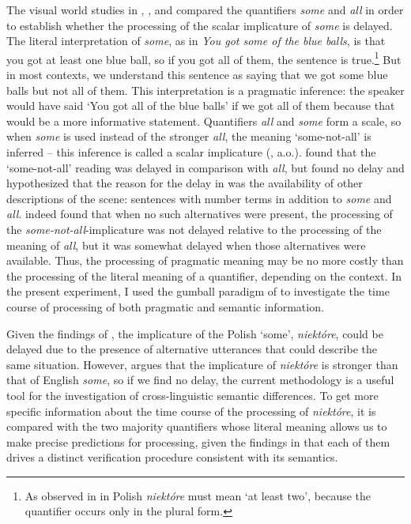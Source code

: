\documentclass[output=paper]{langscibook}
\begin{document}
The visual world studies in \citet{huang2009online, huang2011logic}, \citet{grodner2010some}, and \citet{degen2011making, degen2016availability}
compared the quantifiers \textit{some} and \textit{all} in order to establish whether the processing of the scalar
implicature of \textit{some} is delayed. The literal interpretation of \textit{some}, as in \textit{You got some of the blue
balls}, is that you got at least one
blue ball, so if you got all of them, the sentence is true.\footnote{As observed in \citet{spychalska-msc} in Polish \textit{niektóre} must mean `at least two', because the quantifier occurs only in the plural form.} But in most contexts, we understand this sentence as saying
that we got some blue balls but not all of them. This interpretation is a pragmatic inference: the speaker would have
said ‘You got all of the blue balls’ if we got all of them because that would be a more informative statement.
Quantifiers \textit{all} and \textit{some} form a scale, so when \textit{some} is used instead of the stronger
\textit{all}, the meaning `some-not-all' is inferred -- this inference is called a scalar implicature (\citealt{horn1972, Levinson1983}, a.o.). \citet{huang2009online} found that the `some-not-all' reading was delayed in
comparison with \textit{all}, but \citet{grodner2010some} found no delay and \citet{degen2011making, degen2016availability} hypothesized
that the reason for the delay in \citet{huang2009online} was the availability of other descriptions of the scene:
sentences with number terms in addition to \textit{some }and \textit{all}. \citet{degen2016availability} indeed found that
when no such alternatives were present, the processing of the \textit{some-not-all}-implicature was not delayed
relative to the processing of the meaning of \textit{all}, but it was somewhat delayed when those alternatives were
available. Thus, the processing of pragmatic meaning may be no more costly than the processing of the literal meaning
of a quantifier, depending on the context. In the present experiment, I used the gumball paradigm of \citet{degen2011making, degen2016availability} to investigate the time course of processing of both pragmatic and semantic information. 

Given the findings of \citet{degen2011making, degen2016availability}, the implicature of the Polish `some', \textit{niektóre}, could be
delayed due to the presence of alternative utterances that could describe the same situation. However, \citet{spychalska-msc} argues that the implicature of \textit{niektóre} is stronger than that of English \textit{some}, so if we
find no delay, the current methodology is a useful tool for the investigation of cross-linguistic semantic differences.
To get more specific information about the time course of the processing of \textit{niektóre}, it is compared with the
two majority quantifiers whose literal meaning allows us to make precise predictions for processing, given the findings
in \citet{tomaszewicz2011verification, tomaszewicz2012semantics, tomaszewicz2013linguistic, tomaszewicz2018focus} that each of them drives a distinct verification procedure consistent with its semantics.
\end{document}
